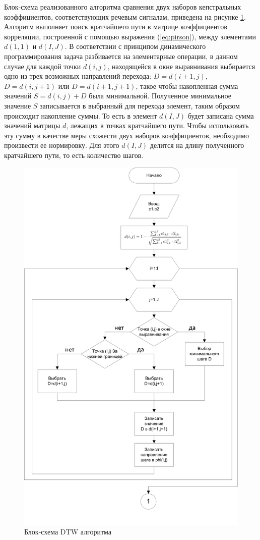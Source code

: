 \documentclass[a4paper,14pt,russian,utf8,nocolumnsxix,nocolumnxxxi,nocolumnxxxii]{eskdtext}
\begin{document}
Блок-схема реализованного алгоритма сравнения двух наборов кепстральных коэффициентов, соответствующих речевым сигналам, приведена на рисунке \ref{block1}. Алгоритм выполняет поиск кратчайшего пути в матрице коэффициентов корреляции, построенной с помощью выражения (\ref{eq:pirson}), между элементами $d(1,1)$ и $d(I,J)$. В соответствии с принципом динамического программирования задача разбивается на элементарные операции, в данном случае для каждой точки $d(i,j)$, находящейся в окне выравнивания выбирается одно из трех возможных направлений перехода: $D=d(i+1,j)$, $D=d(i,j+1)$ или $D=d(i+1,j+1)$, такое чтобы накопленная сумма значений $S=d(i,j)+D$ была минимальной. Полученное минимальное значение $S$ записывается в выбранный для перехода элемент, таким образом происходит накопление суммы. То есть в элемент $d(I,J)$ будет записана сумма значений матрицы $d$, лежащих в точках кратчайшего пути. Чтобы использовать эту сумму в качестве меры схожести двух наборов коэффициентов, необходимо произвести ее нормировку. Для этого $d(I,J)$ делится на длину полученного кратчайшего пути, то есть количество шагов.
\pagebreak
\begin{figure}[H]	
	\centering
	\includegraphics[width=150mm]{block1.png}			
	\caption{Блок-схема DTW алгоритма}
	\label{block1}
\end{figure}
\end{document}
